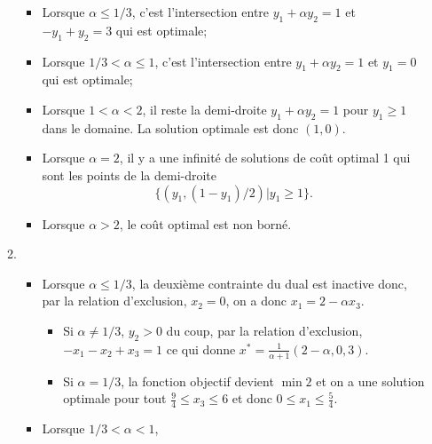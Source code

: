 \begin{enumerate}
\begin{solution}
\begin{enumerate}
\begin{center}
          \end{center}
          \begin{itemize}
            \item Lorsque $\alpha \leq 1/3$, c'est l'intersection entre
              $y_1 + \alpha y_2 = 1$ et $-y_1 + y_2 = 3$  qui est optimale;
            \item Lorsque $1/3 < \alpha \leq 1$, c'est l'intersection entre
              $y_1 + \alpha y_2 = 1$ et $y_1 = 0$  qui est optimale;
            \item Lorsque $1 < \alpha < 2$, il reste la demi-droite $y_1 + \alpha y_2 = 1$
              pour $y_1 \geq 1$ dans le domaine.
              La solution optimale est donc $(1,0)$.
            \item Lorsque $\alpha = 2$, il y a une infinité de solutions
              de coût optimal 1 qui sont les points de la demi-droite
              \[ \{(y_1,(1-y_1)/2) | y_1 \geq 1\}. \]
            \item Lorsque $\alpha > 2$, le coût optimal est non borné.
          \end{itemize}
        \item
          \begin{itemize}
            \item Lorsque $\alpha \leq 1/3$, la deuxième contrainte
              du dual est inactive donc,
              par la relation d'exclusion, $x_2 = 0$, on a donc
              $x_1 = 2 - \alpha x_3$.
              \begin{itemize}
                \item Si $\alpha \neq 1/3$, $y_2 > 0$ du coup,
                  par la relation d'exclusion, $-x_1 -x_2+ x_3 = 1$ ce qui
                  donne $x^* = \frac{1}{\alpha+1}(2-\alpha,0, 3)$.
                \item Si $\alpha = 1/3$, la fonction objectif devient
                  $\min 2$ et on a une solution optimale pour tout
                  $\frac{9}{4} \leq x_3 \leq 6$ et donc
                  $0 \leq x_1 \leq \frac{5}{4}$.
              \end{itemize}
            \item Lorsque $1/3 < \alpha < 1$,

\end{itemize}
\end{enumerate}
\end{solution}
\end{enumerate}
